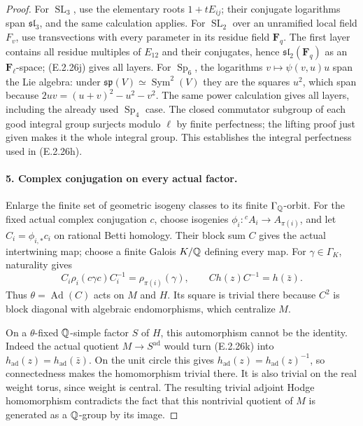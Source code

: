 \begin{proof}
For \(\operatorname{SL}_3\), use the elementary roots
\(1+tE_{ij}\); their conjugate logarithms span
\(\mathfrak{sl}_3\), and the same calculation applies.
For \(\operatorname{SL}_2\) over an unramified local
field \(F_v\), use transvections with every parameter in
its residue field \(\mathbf F_q\). The first layer
contains all residue multiples of \(E_{12}\) and their
conjugates, hence \(\mathfrak{sl}_2(\mathbf F_q)\) as
an \(\mathbf F_\ell\)-space; (E.2.26j) gives all layers.
For \(\operatorname{Sp}_6\), the logarithms
\(v\mapsto\psi(v,u)u\) span the Lie algebra: under
\(\mathfrak{sp}(V)\simeq\operatorname{Sym}^2(V)\)
they are the squares \(u^2\), which span because
\(2uv=(u+v)^2-u^2-v^2\). The same power calculation
gives all layers, including the already used
\(\operatorname{Sp}_4\) case.
The closed commutator subgroup of each good integral group
surjects modulo \(\ell\) by finite perfectness; the lifting
proof just given makes it the whole integral group. This
establishes the integral perfectness used in (E.2.26h).

\paragraph{5. Complex conjugation on every actual factor.}
Enlarge the finite set of geometric isogeny classes to its
finite \(\Gamma_\mathbb Q\)-orbit. For the fixed actual complex
conjugation \(c\), choose isogenies
\(\phi_i:{}^c A_i\to A_{\pi(i)}\), and let
\(C_i=\phi_{i,*}c_i\) on rational Betti homology.
Their block sum \(C\) gives the actual intertwining map;
choose a finite Galois \(K/\mathbb Q\) defining every map.
For \(\gamma\in\Gamma_K\), naturality gives
\[
 C_i\rho_i(c\gamma c)C_i^{-1}
         =\rho_{\pi(i)}(\gamma),\qquad
 C h(z)C^{-1}=h(\bar z).
 \tag{E.2.26k}
\]
Thus \(\theta=\operatorname{Ad}(C)\) acts on \(M\)
and \(H\). Its square is trivial there because \(C^2\)
is block diagonal with algebraic endomorphisms, which
centralize \(M\).

On a \(\theta\)-fixed \(\mathbb Q\)-simple factor \(S\)
of \(H\), this automorphism cannot be the identity.
Indeed the actual quotient \(M\to S^{\mathrm{ad}}\)
would turn (E.2.26k) into
\(h_{\mathrm{ad}}(z)=h_{\mathrm{ad}}(\bar z)\).
On the unit circle this gives
\(h_{\mathrm{ad}}(z)=h_{\mathrm{ad}}(z)^{-1}\), so
connectedness makes the homomorphism trivial there.
It is also trivial on the real weight torus, since
weight is central. The resulting trivial adjoint
Hodge homomorphism contradicts the fact that this
nontrivial quotient of \(M\) is generated as a
\(\mathbb Q\)-group by its image.


\end{proof}
